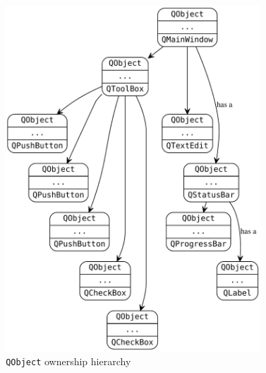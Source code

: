 \begin{frame}
\begin{columns}
\begin{column}{0.47\textwidth}
\begin{figure}[!t]
    \end{figure}
    \end{column}
    \begin{column}{0.52\textwidth}
    \begin{figure}[!t]
    \centering
    \includegraphics[height=0.72\textheight]{images/qobject_tree.pdf}
    \caption{\footnotesize \texttt{QObject} ownership hierarchy}
    \end{figure}
    \end{column}
  \end{columns}
\end{frame}

